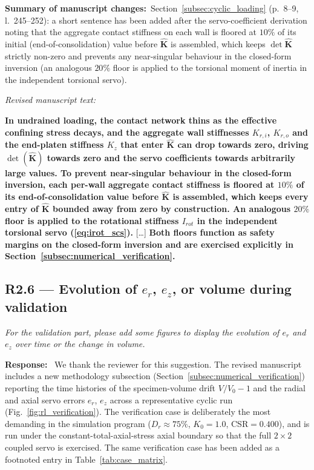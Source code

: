 \documentclass[11pt,a4paper]{article}
\newenvironment{rcomment}
  {\begin{leftbar}\color{black!75}\itshape}
  {\end{leftbar}\vspace{0.3em}}
\newcommand{\response}{\par\noindent\textbf{Response:}\ \ignorespaces}
\newcommand{\changed}[1]{\par\noindent\textbf{Summary of manuscript changes:}\ #1\par}
\newenvironment{revtext}
  {\par\vspace{0.2em}\noindent\textit{Revised manuscript text:}\par
   \begingroup\color{black}\begin{leftbar}\small}
  {\end{leftbar}\endgroup\vspace{0.3em}}
\newcommand{\manref}[1]{(#1)}                  %
\newcommand{\Kzero}{\ensuremath{K_0}}
\begin{document}
\changed{Section~\ref{subsec:cyclic_loading}
\manref{p.~8--9, l.~245--252}: a short sentence has been added after
the servo-coefficient derivation noting that the aggregate contact
stiffness on each wall is floored at $10\%$ of its initial
(end-of-consolidation) value before $\hat{\mathbf{K}}$ is assembled,
which keeps $\det\hat{\mathbf{K}}$ strictly non-zero and prevents
any near-singular behaviour in the closed-form inversion (an
analogous $20\%$ floor is applied to the torsional moment of inertia
in the independent torsional servo).}

\begin{revtext}
\textbf{In undrained loading, the contact network thins as the
effective confining stress decays, and the aggregate wall
stiffnesses $K_{r,i}$, $K_{r,o}$ and the end-platen stiffness $K_z$
that enter $\hat{\mathbf{K}}$ can drop towards zero, driving
$\det(\hat{\mathbf{K}})$ towards zero and the servo coefficients
towards arbitrarily large values. To prevent near-singular behaviour
in the closed-form inversion, each per-wall aggregate contact
stiffness is floored at $10\%$ of its end-of-consolidation value
before $\hat{\mathbf{K}}$ is assembled, which keeps every entry of
$\hat{\mathbf{K}}$ bounded away from zero by construction. An
analogous $20\%$ floor is applied to the rotational stiffness
$I_{rot}$ in the independent torsional servo
(\cref{eq:irot_scs}).} [\ldots] \textbf{Both floors function as
safety margins on the closed-form inversion and are exercised
explicitly in Section~\ref{subsec:numerical_verification}.}
\end{revtext}

\subsection*{R2.6 --- Evolution of $e_r$, $e_z$, or volume during validation}

\begin{rcomment}
For the validation part, please add some figures to display the evolution
of $e_r$ and $e_z$ over time or the change in volume.
\end{rcomment}

\response
We thank the reviewer for this suggestion. The revised manuscript
includes a new methodology subsection
(Section~\ref{subsec:numerical_verification}) reporting the time
histories of the specimen-volume drift $V/V_0-1$ and the radial and
axial servo errors $e_r$, $e_z$ across a representative cyclic run
(Fig.~\ref{fig:rl_verification}). The verification case is
deliberately the most demanding in the simulation program
($D_r\approx 75\%$, $\Kzero=1.0$, CSR$=0.400$), and is run under the
constant-total-axial-stress axial boundary so that the full
$2\times 2$ coupled servo is exercised. The same verification case
has been added as a footnoted entry in Table~\ref{tab:case_matrix}.
\end{document}
